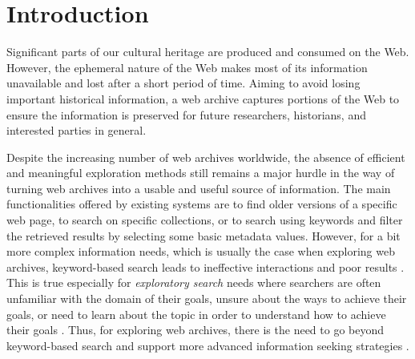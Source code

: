 \documentclass[twocolumn]{svjour3}
\begin{document}
\section{Introduction}
Significant parts of our cultural heritage are produced and consumed on the Web.
However, the ephemeral nature of the Web makes most of its information
unavailable and lost after a short period of time.
Aiming to avoid losing important historical information,
a web archive captures portions of the Web to ensure the information
is preserved for future researchers, historians,
and interested parties in general.

Despite the increasing number of web archives worldwide,
the absence of efficient and meaningful exploration methods
still remains a major hurdle in the
way of turning web archives into a usable and useful source of information.
The main functionalities offered by existing systems are to find
older versions of a specific web page,
to search on specific collections,
or to search using keywords
and filter the retrieved results by
selecting some basic metadata values.
However,
for a bit more complex information needs,
which is usually the case when exploring web archives,
keyword-based search
leads to ineffective interactions and poor results \cite{weikum2011longitudinal}.
This is true especially for {\em exploratory search} needs
where searchers
are often unfamiliar with the domain of their goals,
unsure about the ways to achieve their goals,
or need to learn about the topic in order to understand how to
achieve their goals \cite{marchionini2006exploratory}.
Thus, for exploring web archives,
there is the need to go beyond keyword-based search and
support more advanced information seeking
strategies \cite{weikum2011longitudinal,whitelaw2015generous,holzmannaccessing2017}.
\end{document}
